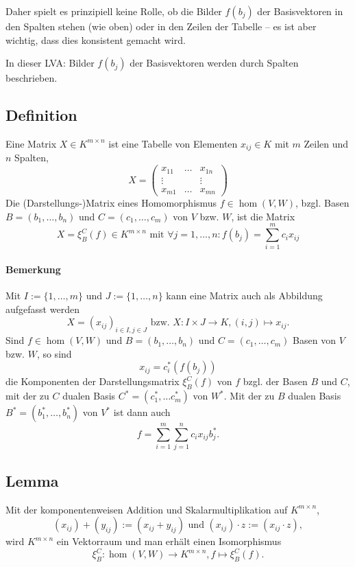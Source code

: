 	Daher spielt es prinzipiell keine Rolle, ob die Bilder $ f(b_j) $ der Basisvektoren in den Spalten stehen (wie oben) oder in den Zeilen der Tabelle -- es ist aber wichtig, dass dies konsistent gemacht wird.
	
	In dieser LVA: Bilder $ f(b_j) $ der Basisvektoren werden durch Spalten beschrieben.

\subsection{Definition}
	\begin{Definition}[Matrix]
		Eine Matrix $ X\in K^{m\times n} $ ist eine Tabelle von Elementen $ x_{ij}\in K $ mit $ m $ Zeilen und $ n $ Spalten,
			\[ X = \begin{pmatrix}
			x_{11} 		& \dots 	& x_{1n}\\
			\vdots 		& 			& \vdots\\
			x_{m1} 		& \dots		& x_{mn}
			\end{pmatrix} \]
		Die (Darstellungs-)Matrix eines Homomorphismus $ f\in \hom(V,W) $, bzgl. Basen $ B= (b_1,\dots,b_n) $ und $ C=(c_1,\dots,c_m) $ von $ V $ bzw. $ W $, ist die Matrix
			\[ X = \xi^C_B(f)\in K^{m\times n}\text{ mit }\forall j=1,\dots,n:f(b_j) = \sum_{i=1}^{m}c_ix_{ij} \]
	\end{Definition}
	
\paragraph{Bemerkung}
	Mit $ I:= \{1,\dots,m\} $ und $ J:= \{1,\dots,n\} $ kann eine Matrix auch als Abbildung aufgefasst werden
		\[ X = (x_{ij})_{i\in I,j\in J}\text{ bzw. }X:I\times J\to K,(i,j)\mapsto x_{ij}. \]
	Sind $ f\in \hom(V,W) $ und $ B=(b_1,\dots,b_n) $ und $ C=(c_1,\dots,c_m) $ Basen von $ V $ bzw. $ W $, so sind
		\[ x_{ij} = c_i^*(f(b_j)) \]
	die Komponenten der Darstellungsmatrix $ \xi_B^C(f) $ von $ f $ bzgl. der Basen $ B $ und $ C $, mit der zu $ C $ dualen Basis $ C^*=(c_1^*,\dots c_m^*) $ von $ W^* $. Mit der zu $ B $ dualen Basis $ B^*= (b_1^*,\dots,b_n^*) $ von $ V^* $ ist dann auch
		\[ f=\sum_{i=1}^{m}\sum_{j=1}^{n} c_ix_{ij}b_j^*. \]
\subsection{Lemma}
	\begin{Lemma}
	Mit der komponentenweisen Addition und Skalarmultiplikation auf $ K^{m\times n} $,
		\[ (x_{ij})+(y_{ij}) := (x_{ij}+y_{ij}) \text{ und } (x_{ij})\cdot z := (x_{ij}\cdot z), \]
	wird $ K^{m\times n} $ ein Vektorraum und man erhält einen Isomorphismus
		\[ \xi_B^C:\hom(V,W)\to K^{m\times n},f\mapsto \xi_B^C(f). \]
	\end{Lemma}
